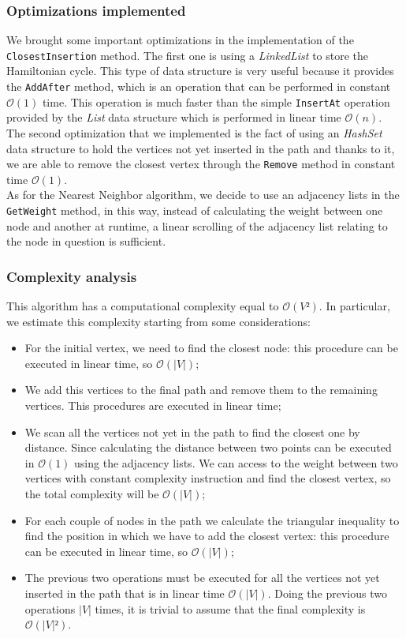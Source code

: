 \subsubsection{Optimizations implemented}
We brought some important optimizations in the implementation of the \verb|ClosestInsertion| method. The first one is using a \textit{LinkedList} to store the Hamiltonian cycle. This type of data structure is very useful because it provides the \verb|AddAfter| method, which is an operation that can be performed in constant $\mathcal{O}(1)$ time. This operation is much faster than the simple \verb|InsertAt| operation provided by the \textit{List} data structure which is performed in linear time $\mathcal{O}(n)$.\\ \noindent
The second optimization that we implemented is the fact of using an \textit{HashSet} data structure to hold the vertices not yet inserted in the path and thanks to it, we are able to remove the closest vertex through the \verb|Remove| method in constant time $\mathcal{O}(1)$.\\ \noindent
As for the Nearest Neighbor algorithm, we decide to use an adjacency lists in the \verb|GetWeight| method, in this way, instead of calculating the weight between one node and another at runtime, a linear scrolling of the adjacency list relating to the node in question is sufficient.

\subsubsection{Complexity analysis}
This algorithm has a computational complexity equal to $\mathcal{O}(V²)$. In particular, we estimate this complexity starting from some considerations:
\begin{itemize}
    \item For the initial vertex, we need to find the closest node: this procedure can be executed in linear time, so $\mathcal{O}(|V|)$;
    \item We add this vertices to the final path and remove them to the remaining vertices. This procedures are executed in linear time;
    \item We scan all the vertices not yet in the path to find the closest one by distance. Since calculating the distance between two points can be executed in $\mathcal{O}(1)$ using the adjacency lists. We can access to the weight between two vertices with constant complexity instruction and find the closest vertex, so the total complexity will be $\mathcal{O}(|V|)$;
    \item For each couple of nodes in the path we calculate the triangular inequality to find the position in which we have to add the closest vertex: this procedure can be executed in linear time, so $\mathcal{O}(|V|)$;
    \item The previous two operations must be executed for all the vertices not yet inserted in the path that is in linear time $\mathcal{O}(|V|)$. Doing the previous two operations $|V|$ times, it is trivial to assume that the final complexity is $\mathcal{O}(|V|²)$. 
\end{itemize}

